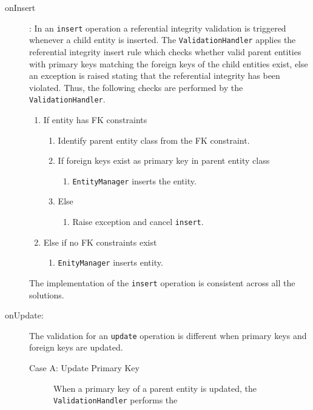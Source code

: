 		\begin{description}
		\item[onInsert]: 
		In an \texttt{insert} operation a referential
		integrity validation is triggered whenever a child entity is  inserted. 
		The \texttt{ValidationHandler} applies the referential integrity insert
		rule which checks whether  valid parent entities with
		primary keys matching the foreign keys of the child entities exist, else an
		exception is raised stating that the referential integrity has been violated.
		Thus, the following checks are performed by the \texttt{ValidationHandler}.
		\renewcommand{\labelenumii}{\arabic{enumi}.\arabic{enumii}}
		\renewcommand{\labelenumiii}{\arabic{enumi}.\arabic{enumii}.\arabic{enumiii}}
		
		\begin{enumerate}
		\item If entity has \ac{FK} constraints
				\begin{enumerate}
				\item Identify parent entity class from the \ac{FK} constraint.
				\item If foreign keys exist as  primary key in  parent entity class
				  		\begin{enumerate}
				  		\item \texttt{EntityManager} inserts the entity.
				  		\end{enumerate}
				\item Else
				   		\begin{enumerate}
				   		  \item Raise exception and cancel \texttt{insert}.
				   		\end{enumerate}
				\end{enumerate}   	
		\item Else if no \ac{FK} constraints exist
		  		\begin{enumerate}
		  		\item \texttt{EnityManager} inserts entity.
		  		\end{enumerate}
		\end{enumerate}
		The implementation of the \texttt{insert} operation is consistent across all the
		solutions. 
		\item[onUpdate:] The validation for an \texttt{update} operation is different
		when primary keys and foreign keys are updated. 
		\begin{description}
		\item[Case A: Update Primary Key] When a  primary key of a
		parent entity is updated, the \texttt{ValidationHandler} performs the

\end{description}
\end{description}
